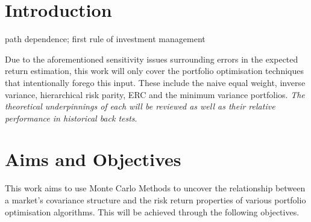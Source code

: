 \documentclass[11pt,preprint, authoryear]{elsarticle}
\numberwithin{equation}{section}
\numberwithin{figure}{section}
\numberwithin{table}{section}
\begin{document}

\headsep 35pt %




\hypertarget{introduction}{%
\section{\texorpdfstring{Introduction
\label{Introduction}}{Introduction }}\label{introduction}}

path dependence; first rule of investment management

Due to the aforementioned sensitivity issues surrounding errors in the
expected return estimation, this work will only cover the portfolio
optimisation techniques that intentionally forego this input. These
include the naive equal weight, inverse variance, hierarchical risk
parity, ERC and the minimum variance portfolios. \emph{The theoretical
underpinnings of each will be reviewed as well as their relative
performance in historical back tests}.

\hypertarget{aims-and-objectives}{%
\section{Aims and Objectives}\label{aims-and-objectives}}

This work aims to use Monte Carlo Methods to uncover the relationship
between a market's covariance structure and the risk return properties
of various portfolio optimisation algorithms. This will be achieved
through the following objectives.
\end{document}
